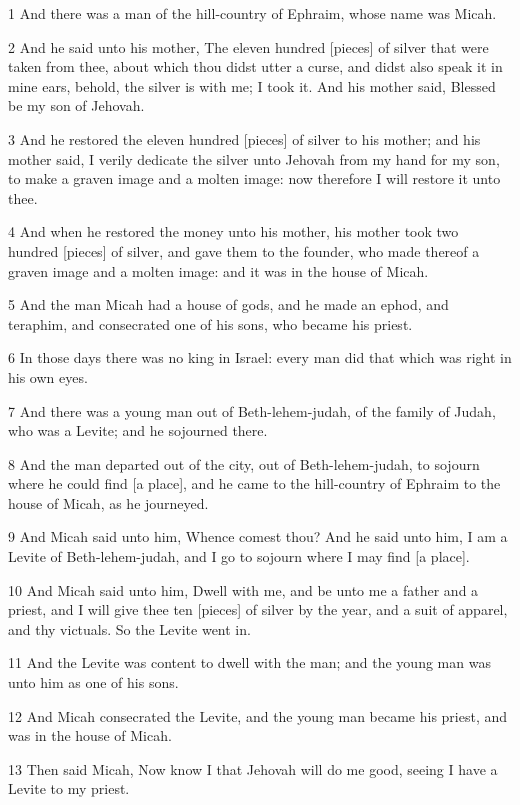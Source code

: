\par 1 And there was a man of the hill-country of Ephraim, whose name was Micah.
\par 2 And he said unto his mother, The eleven hundred [pieces] of silver that were taken from thee, about which thou didst utter a curse, and didst also speak it in mine ears, behold, the silver is with me; I took it. And his mother said, Blessed be my son of Jehovah.
\par 3 And he restored the eleven hundred [pieces] of silver to his mother; and his mother said, I verily dedicate the silver unto Jehovah from my hand for my son, to make a graven image and a molten image: now therefore I will restore it unto thee.
\par 4 And when he restored the money unto his mother, his mother took two hundred [pieces] of silver, and gave them to the founder, who made thereof a graven image and a molten image: and it was in the house of Micah.
\par 5 And the man Micah had a house of gods, and he made an ephod, and teraphim, and consecrated one of his sons, who became his priest.
\par 6 In those days there was no king in Israel: every man did that which was right in his own eyes.
\par 7 And there was a young man out of Beth-lehem-judah, of the family of Judah, who was a Levite; and he sojourned there.
\par 8 And the man departed out of the city, out of Beth-lehem-judah, to sojourn where he could find [a place], and he came to the hill-country of Ephraim to the house of Micah, as he journeyed.
\par 9 And Micah said unto him, Whence comest thou? And he said unto him, I am a Levite of Beth-lehem-judah, and I go to sojourn where I may find [a place].
\par 10 And Micah said unto him, Dwell with me, and be unto me a father and a priest, and I will give thee ten [pieces] of silver by the year, and a suit of apparel, and thy victuals. So the Levite went in.
\par 11 And the Levite was content to dwell with the man; and the young man was unto him as one of his sons.
\par 12 And Micah consecrated the Levite, and the young man became his priest, and was in the house of Micah.
\par 13 Then said Micah, Now know I that Jehovah will do me good, seeing I have a Levite to my priest.


